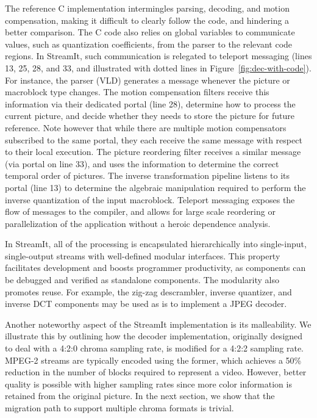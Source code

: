 The reference C implementation intermingles parsing, decoding, and
motion compensation, making it difficult to clearly follow the code,
and hindering a better comparison. The C code also relies on global
variables to communicate values, such as quantization coefficients,
from the parser to the relevant code regions. In StreamIt, such
communication is relegated to teleport messaging (lines 13, 25, 28, and
33, and illustrated with dotted lines in
Figure~\ref{fig:dec-with-code}). For instance, the parser (VLD)
generates a message whenever the picture or macroblock type
changes. The motion compensation filters receive this information via
their dedicated portal (line 28), determine how to process the current
picture, and decide whether they needs to store the picture for future
reference. Note however that while there are multiple motion compensators
subscribed to the same portal, they each receive the same message with
respect to their local execution.
The picture reordering filter receives a similar message
(via portal on line 33), and uses the information to determine the
correct temporal order of pictures. The inverse transformation
pipeline listens to its portal (line 13) to determine the algebraic
manipulation required to perform the inverse quantization of the input
macroblock. Teleport messaging 
exposes the flow of messages to the compiler, and allows for large
scale reordering or parallelization of the application without a
heroic dependence analysis.

In StreamIt, all of the processing is encapsulated hierarchically into
single-input, single-output streams with well-defined modular
interfaces. This property facilitates development and boosts
programmer productivity, as components can be debugged and verified as
standalone components. The modularity also promotes reuse. For
example, the zig-zag descrambler, inverse quantizer, and inverse DCT
components may be used as is to implement a JPEG decoder.

Another noteworthy aspect of the StreamIt implementation is its
malleability. We illustrate this by outlining how the decoder
implementation, originally designed to deal with a 4:2:0 chroma
sampling rate, is modified for a 4:2:2 sampling rate. MPEG-2 streams
are typically encoded using the former, which achieves a 50\%
reduction in the number of blocks required to represent a
video. However, better quality is possible with higher sampling rates
since more color information is retained from the original picture. In
the next section, we show that the migration path to support multiple
chroma formats is trivial.

